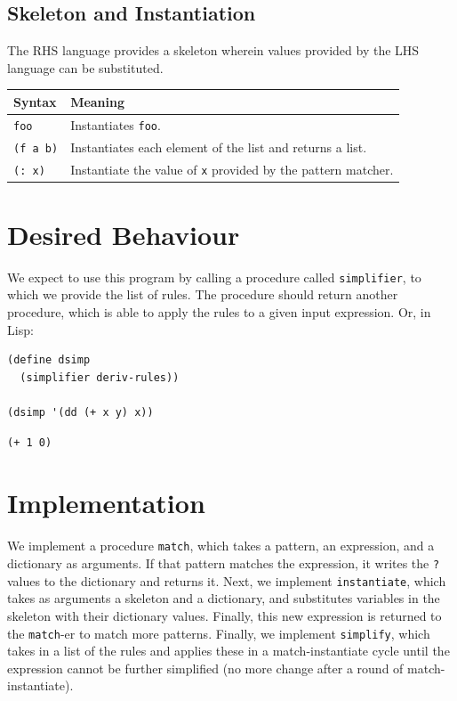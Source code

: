 \documentclass[9pt]{report}
\begin{document}
\subsection{Skeleton and Instantiation}
\label{sec:orge75fbd7}
The RHS language provides a skeleton wherein values provided by
the LHS language can be substituted.

\begin{center}
\begin{tabular}{ll}
\toprule
Syntax & Meaning\\
\midrule
\texttt{foo} & Instantiates \texttt{foo}.\\
\texttt{(f a b)} & Instantiates each element of the list and returns a list.\\
\texttt{(: x)} & Instantiate the value of \texttt{x} provided by the pattern matcher.\\
\bottomrule
\end{tabular}
\end{center}

\section{Desired Behaviour}
\label{sec:orgb6c3f24}

We expect to use this program by calling a procedure called
\texttt{simplifier}, to which we provide the list of rules. The procedure
should return another procedure, which is able to apply the rules
to a given input expression. Or, in Lisp:

\begin{verbatim}
(define dsimp
  (simplifier deriv-rules))

(dsimp '(dd (+ x y) x))
\end{verbatim}

\begin{verbatim}
(+ 1 0)
\end{verbatim}

\section{Implementation}
\label{sec:orgda6f39f}

We implement a procedure \texttt{match}, which takes a pattern, an
expression, and a dictionary as arguments. If that pattern matches
the expression, it writes the \texttt{?} values to the dictionary and
returns it. Next, we implement \texttt{instantiate}, which takes as
arguments a skeleton and a dictionary, and substitutes variables in
the skeleton with their dictionary values. Finally, this new
expression is returned to the \texttt{match}-er to match more patterns.
Finally, we implement \texttt{simplify}, which takes in a list of the
rules and applies these in a match-instantiate cycle until the
expression cannot be further simplified (no more change after a
round of match-instantiate).
\end{document}
